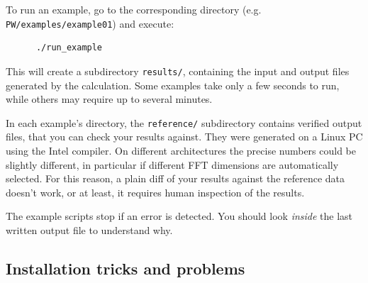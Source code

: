 \documentclass[12pt,a4paper]{article}
\begin{document}
To run an example, go to the corresponding directory (e.g.
 \texttt{PW/examples/example01}) and execute:
\begin{verbatim}
      ./run_example
\end{verbatim}
This will create a subdirectory \texttt{results/}, containing the input and
output files generated by the calculation. Some examples take only a
few seconds to run, while others may require up to several minutes.

In each example's directory, the \texttt{reference/} subdirectory contains
verified output files, that you can check your results against. They
were generated on a Linux PC using the Intel compiler. On different
architectures the precise numbers could be slightly different, in
particular if different FFT dimensions are automatically selected. For
this reason, a plain diff of your results against the reference data
doesn't work, or at least, it requires human inspection of the results.

The example scripts stop if an error is detected. You should look {\em inside}
the last written output file to understand why.

\subsection{Installation tricks and problems}
\end{document}
